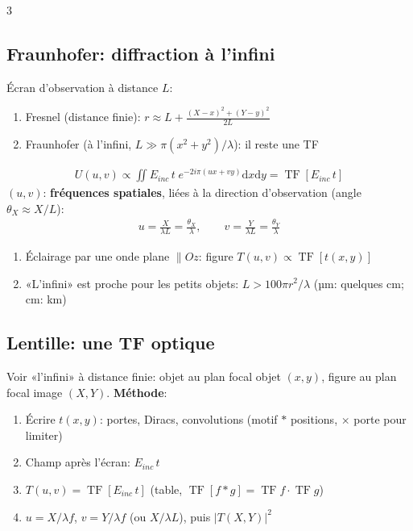 \documentclass[12pt, a4paper]{article}
\newcommand{\TF}{\operatorname{TF}}
\newcommand{\dd}{\mathrm{d}}
\begin{document}
\begin{multicols*}{3}
	\subsection{Fraunhofer: diffraction à l'infini}
	Écran d'observation à distance $L$:
	\begin{enumerate}[\roman*.]
		\item Fresnel (distance finie): $r\approx L+\frac{(X-x)^2+(Y-y)^2}{2L}$
		\item Fraunhofer (à l'infini, $L\gg\pi(x^2+y^2)/\lambda$): il reste une TF
	\end{enumerate}
	\begin{gather*}
		U(u,v)\propto\iint E_{inc}\,t\;e^{-2i\pi(ux+vy)}\dd x\dd y=\TF[E_{inc}\,t]
	\end{gather*}
	$(u,v)$: \textbf{fréquences spatiales}, liées à la direction d'observation (angle $\theta_X\approx X/L$):
	\begin{gather*}
		u=\frac{X}{\lambda L}=\frac{\theta_X}{\lambda},\qquad v=\frac{Y}{\lambda L}=\frac{\theta_Y}{\lambda}
	\end{gather*}
	\begin{enumerate}[\roman*.]
		\item Éclairage par une onde plane $\parallel Oz$: figure $T(u,v)\propto\TF[t(x,y)]$
		\item «L'infini» est proche pour les petits objets: $L>100\pi r^2/\lambda$ (µm: quelques cm; cm: km)
	\end{enumerate}

	\colbreak
	\subsection{Lentille: une TF optique}
	Voir «l'infini» à distance finie: objet au plan focal objet $(x,y)$, figure au plan focal image $(X,Y)$. \textbf{Méthode}:
	\begin{enumerate}[\roman*.]
		\item Écrire $t(x,y)$: portes, Diracs, convolutions (motif $*$ positions, $\times$ porte pour limiter)
		\item Champ après l'écran: $E_{inc}\,t$
		\item $T(u,v)=\TF[E_{inc}\,t]$ (table, $\TF[f*g]=\TF f\cdot\TF g$)
		\item $u=X/\lambda f$, $v=Y/\lambda f$ (ou $X/\lambda L$), puis $|T(X,Y)|^2$
	\end{enumerate}


\end{multicols*}
\end{document}
